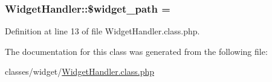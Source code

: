 \subsubsection[{\texorpdfstring{\$widget\+\_\+path}{$widget_path}}]{\setlength{\rightskip}{0pt plus 5cm}Widget\+Handler\+::\$widget\+\_\+path = \textquotesingle{}\textquotesingle{}}\hypertarget{classWidgetHandler_a153b7e8baf0e97c152eb6d4dfae17e9d}{}\label{classWidgetHandler_a153b7e8baf0e97c152eb6d4dfae17e9d}


Definition at line 13 of file Widget\+Handler.\+class.\+php.



The documentation for this class was generated from the following file\+:\begin{DoxyCompactItemize}
\item 
classes/widget/\hyperlink{WidgetHandler_8class_8php}{Widget\+Handler.\+class.\+php}\end{DoxyCompactItemize}
